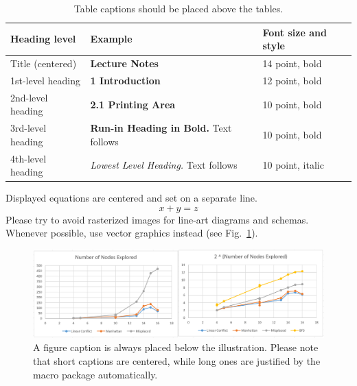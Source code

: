 \documentclass[runningheads]{llncs}
\begin{document}
\begin{table}
\caption{Table captions should be placed above the
tables.}\label{tab1}
\begin{tabular}{|l|l|l|}
\hline
Heading level &  Example & Font size and style\\
\hline
Title (centered) &  {\Large\bfseries Lecture Notes} & 14 point, bold\\
1st-level heading &  {\large\bfseries 1 Introduction} & 12 point, bold\\
2nd-level heading & {\bfseries 2.1 Printing Area} & 10 point, bold\\
3rd-level heading & {\bfseries Run-in Heading in Bold.} Text follows & 10 point, bold\\
4th-level heading & {\itshape Lowest Level Heading.} Text follows & 10 point, italic\\
\hline
\end{tabular}
\end{table}


\noindent Displayed equations are centered and set on a separate
line.
\begin{equation}
x + y = z
\end{equation}
Please try to avoid rasterized images for line-art diagrams and
schemas. Whenever possible, use vector graphics instead (see
Fig.~\ref{fig1}).

\begin{figure}
\includegraphics[width=\textwidth]{Results.PNG}
\caption{A figure caption is always placed below the illustration.
Please note that short captions are centered, while long ones are
justified by the macro package automatically.} \label{fig1}
\end{figure}
\end{document}
